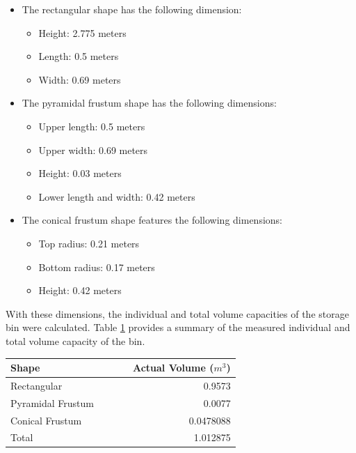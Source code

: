 \begin{itemize}
	\item The rectangular shape has the following dimension:
	      \begin{itemize}
		      \item Height: 2.775 meters
		      \item Length: 0.5 meters
		      \item Width: 0.69 meters
	      \end{itemize}
	\item The pyramidal frustum shape has the following dimensions:
	      \begin{itemize}
		      \item Upper length: 0.5 meters
		      \item Upper width: 0.69 meters
		      \item Height: 0.03 meters
		      \item Lower length and width: 0.42 meters
	      \end{itemize}
	\item The conical frustum shape features the following dimensions:
	      \begin{itemize}
		      \item Top radius: 0.21 meters
		      \item Bottom radius: 0.17 meters
		      \item Height: 0.42 meters
	      \end{itemize}
\end{itemize}

With these dimensions, the individual and total volume capacities of the storage bin were calculated. Table \ref{ch4:tab:volume-calculation} provides a summary of the measured individual and total volume capacity of the bin. \\


\begin{table}[H]
	\centering
	\label{ch4:tab:volume-calculation}
	\begin{tabularx}{0.69\textwidth}{l c c c r}
		\toprule
		\textbf{Shape}    & {} & {} & {} & \textbf{Actual Volume ($m^{3}$)} \\ \midrule

		Rectangular       & {} & {} & {} & 0.9573                           \\

		Pyramidal Frustum & {} & {} & {} & 0.0077                           \\

		Conical Frustum   & {} & {} & {} & 0.0478088                        \\ \midrule

		Total             & {} & {} & {} & 1.012875                         \\ \bottomrule
	\end{tabularx}
\end{table}

